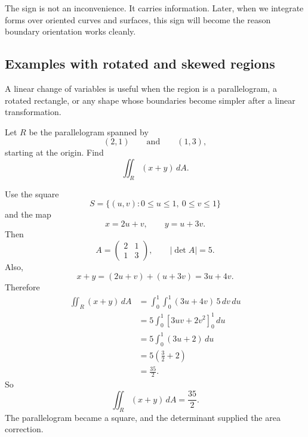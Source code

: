 The sign is not an inconvenience.  It carries information.  Later, when we integrate
forms over oriented curves and surfaces, this sign will become the reason boundary
orientation works cleanly.

\subsection{Examples with rotated and skewed regions}

A linear change of variables is useful when the region is a parallelogram, a rotated
rectangle, or any shape whose boundaries become simpler after a linear transformation.

\begin{example}
Let \(R\) be the parallelogram spanned by
\[
    (2,1)
    \qquad\text{and}\qquad
    (1,3),
\]
starting at the origin.  Find
\[
    \iint_R (x+y)\,dA.
\]

Use the square
\[
    S=\{(u,v):0\le u\le1,\ 0\le v\le1\}
\]
and the map
\[
    x=2u+v,
    \qquad
    y=u+3v.
\]
Then
\[
    A=
    \begin{pmatrix}
        2&1\\
        1&3
    \end{pmatrix},
    \qquad
    |\det A|=5.
\]
Also,
\[
    x+y=(2u+v)+(u+3v)=3u+4v.
\]
Therefore
\[
\begin{aligned}
\iint_R (x+y)\,dA
&=
\int_0^1\int_0^1 (3u+4v)\,5\,dv\,du\\
&=
5\int_0^1\left[3uv+2v^2\right]_{0}^{1}\,du\\
&=
5\int_0^1(3u+2)\,du\\
&=
5\left(\frac32+2\right)\\
&=
\frac{35}{2}.
\end{aligned}
\]
So
\[
\boxed{
    \iint_R (x+y)\,dA=\frac{35}{2}.
}
\]
The parallelogram became a square, and the determinant supplied the area correction.
\end{example}

